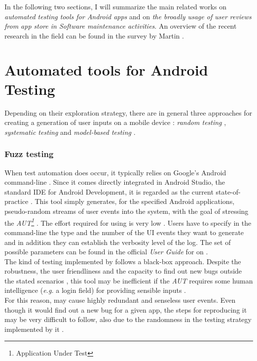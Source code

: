 \label{chapter:related}
In the following two sections, I will summarize the main related works on \textit{automated testing tools for Android apps} and on \textit{the broadly usage of user reviews from app store in Software maintenance activities}. 
An overview of the recent research in the field can be found in the survey by Martin \etal \cite{Martin:tse2017}. 
\section{Automated tools for Android Testing}
\label{sec:tools}
Depending on their exploration strategy, there are in general three approaches for creating a generation of user inputs on a mobile device \cite{areWeThereYet}: \textit{random testing} \cite{dynodroid, monkey}, \textit{systematic testing} \cite{evodroid} and \textit{model-based testing} \cite{mobiguitar, swift, mining}. 
\subsubsection{Fuzz testing}
When test automation does occur, it typically relies on Google's Android \monkey command-line \cite{monkey}. Since it comes directly integrated in Android Studio, the standard IDE for Android Development, it is regarded as the current state-of-practice \cite{evodroid}.
This tool simply generates, for the specified Android applications, pseudo-random streams of user events into the system, with the goal of stressing the \textit{AUT\footnote{Application Under Test}} \cite{monkey}.  
The effort required for using \monkey is very low \cite{areWeThereYet}. Users have to specify in the command-line the type and the number of the UI events they want to generate and in addition they can establish the verbosity level of the \monkey log. 
The set of possible \monkey parameters can be found in the official \textit{User Guide} for \monkey on \cite{monkey}. \\
The kind of testing implemented by \monkey follows a black-box approach. 
Despite the robustness, the user friendliness \cite{areWeThereYet, dynodroid} and the capacity to find out new bugs outside the stated scenarios  \cite{monkey_2}, this tool may be inefficient if the \textit{AUT} requires some human intelligence (\textit{e.g.} a login field) for providing sensible inputs \cite{dynodroid}. \\
For this reason, \monkey may cause highly redundant and senseless user events. Even though it would find out a new bug for a given app, the steps for reproducing it may be very difficult to follow, also due to the randomness in the testing strategy implemented by it \cite{monkey_2}. 



